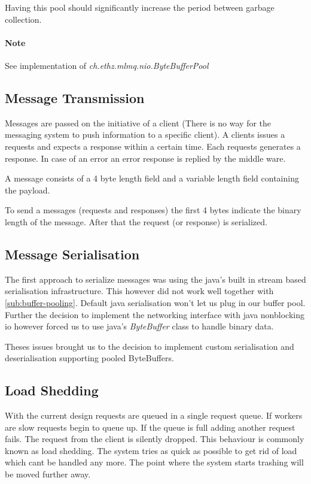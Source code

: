 \documentclass[milestone1.tex]{subfiles}
\begin{document}
Having this pool should significantly increase the period between garbage collection.

\paragraph{Note}
See implementation of \textit{ch.ethz.mlmq.nio.ByteBufferPool}

\subsection{Message Transmission}
Messages are passed on the initiative of a client (There is no way for the messaging system to push information to a specific client). A clients issues a requests and expects a response within a certain time. Each requests generates a response. In case of an error an error response is replied by the middle ware.

A message consists of a 4 byte length field and a variable length field containing the payload.

To send a messages (requests and responses) the first 4 bytes indicate the binary length of the message. After that the request (or response) is serialized.

\subsection{Message Serialisation}

The first approach to serialize messages was using the java's built in stream based serialisation infrastructure. This however did not work well together with \ref{sub:buffer-pooling}. Default java serialisation won't let us plug in our buffer pool. Further the decision to implement the networking interface with java nonblocking io however forced us to use java's \textit{ByteBuffer} class to handle binary data.

Theses issues brought us to the decision to implement custom serialisation and deserialisation supporting pooled ByteBuffers.

\subsection{Load Shedding}
With the current design requests are queued in a single request queue. If workers are slow requests begin to queue up. If the queue is full adding another request fails. The request from the client is silently dropped. This behaviour is commonly known as load shedding. The system tries as quick as possible to get rid of load which cant be handled any more. The point where the system starts trashing will be moved further away.
\end{document}
